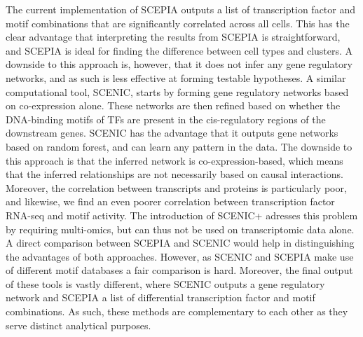 The current implementation of SCEPIA outputs a list of transcription factor and motif combinations that are significantly correlated across all cells. This has the clear advantage that interpreting the results from SCEPIA is straightforward, and SCEPIA is ideal for finding the difference between cell types and clusters. A downside to this approach is, however, that it does not infer any gene regulatory networks, and as such is less effective at forming testable hypotheses. A similar computational tool, SCENIC\cite{Aibar_2017}, starts by forming gene regulatory networks based on co-expression alone. These networks are then refined based on whether the DNA-binding motifs of TFs are present in the cis-regulatory regions of the downstream genes. SCENIC has the advantage that it outputs gene networks based on random forest, and can learn any pattern in the data. The downside to this approach is that the inferred network is co-expression-based, which means that the inferred relationships are not necessarily based on causal interactions. Moreover, the correlation between transcripts and proteins is particularly poor\cite{Fortelny2017,Franks2017}, and likewise, we find an even poorer correlation between transcription factor RNA-seq and motif activity. The introduction of SCENIC+\cite{BravoGonzlezBlas2023} adresses this problem by requiring multi-omics, but can thus not be used on transcriptomic data alone. A direct comparison between SCEPIA and SCENIC would help in distinguishing the advantages of both approaches. However, as SCENIC and SCEPIA make use of different motif databases a fair comparison is hard. Moreover, the final output of these tools is vastly different, where SCENIC outputs a gene regulatory network and SCEPIA a list of differential transcription factor and motif combinations. As such, these methods are complementary to each other as they serve distinct analytical purposes.

